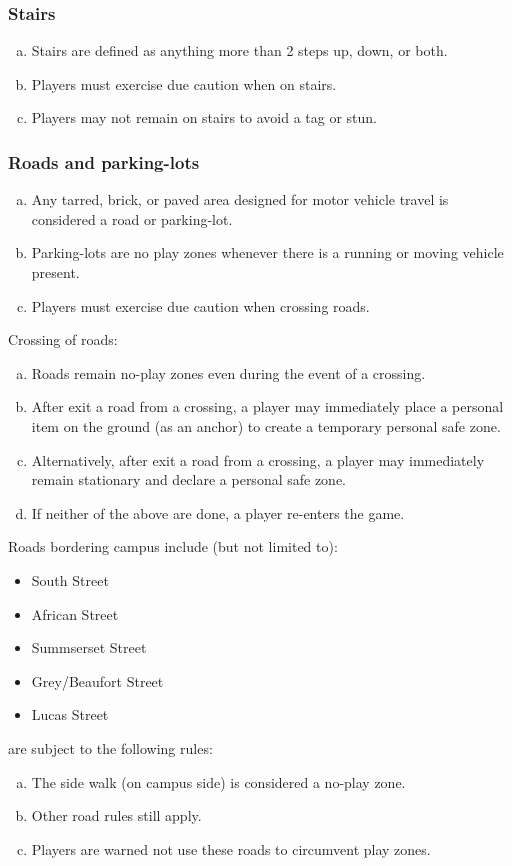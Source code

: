 \documentclass[a4paper,12pt]{article}
\begin{document}
\subsubsection{Stairs}
\begin{enumerate}[(a)]
    \item Stairs are defined as anything more than 2 steps up, down, or both.
    \item Players must exercise due caution when on stairs.
    \item Players may not remain on stairs to avoid a tag or stun.
\end{enumerate}

\subsubsection{Roads and parking-lots}
\begin{enumerate}[(a)]
    \item Any tarred, brick, or paved area designed for motor vehicle travel is considered a road or parking-lot.
    \item Parking-lots are no play zones whenever there is a running or moving vehicle present.
    \item Players must exercise due caution when crossing roads.
\end{enumerate}

Crossing of roads:
\begin{enumerate}[(a)]
    \item Roads remain no-play zones even during the event of a crossing.
    \item After exit a road from a crossing, a player may immediately place a personal item on the ground (as an anchor) to create a temporary personal safe zone.
    \item Alternatively, after exit a road from a crossing, a player may immediately remain stationary and declare a personal safe zone.
 	\item If neither of the above are done, a player re-enters the game.
\end{enumerate}

Roads bordering campus include (but not limited to):
\begin{itemize}
\item South Street
\item African Street
\item Summserset Street
\item Grey/Beaufort Street
\item Lucas Street
\end{itemize}
are subject to the following rules:
\begin{enumerate}[(a)]
\item The side walk (on campus side) is considered a no-play zone.
\item Other road rules still apply.
\item Players are warned not use these roads to circumvent play zones.
\end{enumerate}
\end{document}
